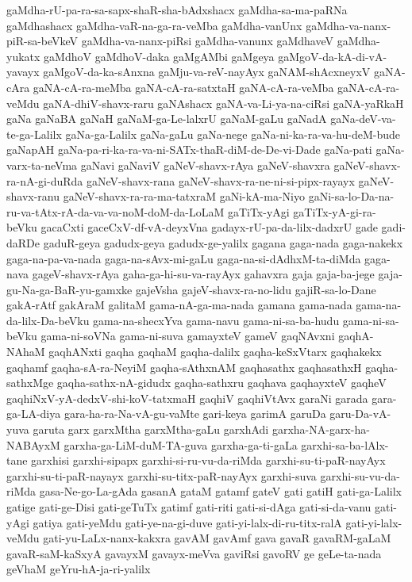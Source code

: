 {gaMdha-rU-pa-ra-sa-sapx-shaR-sha-bAdxshacx
gaMdha-sa-ma-paRNa
gaMdhashacx
gaMdha-vaR-na-ga-ra-veMba
gaMdha-vanUnx
gaMdha-va-nanx-piR-sa-beVkeV
gaMdha-va-nanx-piRsi
gaMdha-vanunx
gaMdhaveV
gaMdha-yukatx
gaMdhoV
gaMdhoV-daka
gaMgAMbi
gaMgeya
gaMgoV-da-kA-di-vA-yavayx
gaMgoV-da-ka-sAnxna
gaMju-va-reV-nayAyx
gaNAM-shAcxneyxV
gaNA-cAra
gaNA-cA-ra-meMba
gaNA-cA-ra-satxtaH
gaNA-cA-ra-veMba
gaNA-cA-ra-veMdu
gaNA-dhiV-shavx-raru
gaNAshacx
gaNA-va-Li-ya-na-ciRsi
gaNA-yaRkaH
gaNa
gaNaBA
gaNaH
gaNaM-ga-Le-lalxrU
gaNaM-gaLu
gaNadA
gaNa-deV-va-te-ga-Lalilx
gaNa-ga-Lalilx
gaNa-gaLu
gaNa-nege
gaNa-ni-ka-ra-va-hu-deM-bude
gaNapAH
gaNa-pa-ri-ka-ra-va-ni-SATx-thaR-diM-de-De-vi-Dade
gaNa-pati
gaNa-varx-ta-neVma
gaNavi
gaNaviV
gaNeV-shavx-rAya
gaNeV-shavxra
gaNeV-shavx-ra-nA-gi-duRda
gaNeV-shavx-rana
gaNeV-shavx-ra-ne-ni-si-pipx-rayayx
gaNeV-shavx-ranu
gaNeV-shavx-ra-ra-ma-tatxraM
gaNi-kA-ma-Niyo
gaNi-sa-lo-Da-na-ru-va-tAtx-rA-da-va-va-noM-doM-da-LoLaM
gaTiTx-yAgi
gaTiTx-yA-gi-ra-beVku
gacaCxti
gaceCxV-df-vA-deyxVna
gadayx-rU-pa-da-lilx-dadxrU
gade
gadi-daRDe
gaduR-geya
gadudx-geya
gadudx-ge-yalilx
gagana
gaga-nada
gaga-nakekx
gaga-na-pa-va-nada
gaga-na-sAvx-mi-gaLu
gaga-na-si-dAdhxM-ta-diMda
gaga-nava
gageV-shavx-rAya
gaha-ga-hi-su-va-rayAyx
gahavxra
gaja
gaja-ba-jege
gaja-gu-Na-ga-BaR-yu-gamxke
gajeVsha
gajeV-shavx-ra-no-lidu
gajiR-sa-lo-Dane
gakA-rAtf
gakAraM
galitaM
gama-nA-ga-ma-nada
gamana
gama-nada
gama-na-da-lilx-Da-beVku
gama-na-shecxYva
gama-navu
gama-ni-sa-ba-hudu
gama-ni-sa-beVku
gama-ni-soVNa
gama-ni-suva
gamayxteV
gameV
gaqNAvxni
gaqhA-NAhaM
gaqhANxti
gaqha
gaqhaM
gaqha-dalilx
gaqha-keSxVtarx
gaqhakekx
gaqhamf
gaqha-sA-ra-NeyiM
gaqha-sAthxnAM
gaqhasathx
gaqhasathxH
gaqha-sathxMge
gaqha-sathx-nA-gidudx
gaqha-sathxru
gaqhava
gaqhayxteV
gaqheV
gaqhiNxV-yA-dedxV-shi-koV-tatxmaH
gaqhiV
gaqhiVtAvx
garaNi
garada
gara-ga-LA-diya
gara-ha-ra-Na-vA-gu-vaMte
gari-keya
garimA
garuDa
garu-Da-vA-yuva
garuta
garx
garxMtha
garxMtha-gaLu
garxhAdi
garxha-NA-garx-ha-NABAyxM
garxha-ga-LiM-duM-TA-guva
garxha-ga-ti-gaLa
garxhi-sa-ba-lAlx-tane
garxhisi
garxhi-sipapx
garxhi-si-ru-vu-da-riMda
garxhi-su-ti-paR-nayAyx
garxhi-su-ti-paR-nayayx
garxhi-su-titx-paR-nayAyx
garxhi-suva
garxhi-su-vu-da-riMda
gasa-Ne-go-La-gAda
gasanA
gataM
gatamf
gateV
gati
gatiH
gati-ga-Lalilx
gatige
gati-ge-Disi
gati-geTuTx
gatimf
gati-riti
gati-si-dAga
gati-si-da-vanu
gati-yAgi
gatiya
gati-yeMdu
gati-ye-na-gi-duve
gati-yi-lalx-di-ru-titx-ralA
gati-yi-lalx-veMdu
gati-yu-LaLx-nanx-kakxra
gavAM
gavAmf
gava
gavaR
gavaRM-gaLaM
gavaR-saM-kaSxyA
gavayxM
gavayx-meVva
gaviRsi
gavoRV
ge
geLe-ta-nada
geVhaM
geYru-hA-ja-ri-yalilx
}
